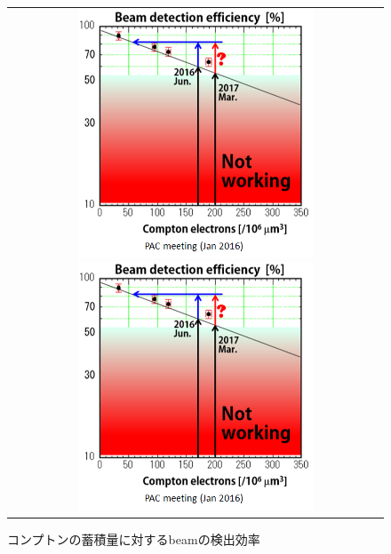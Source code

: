\documentclass[12pt,a4paper]{jarticle}
\begin{document}
\begin{figure}[htbp]
  \centering
      \begin{tabular}{c}
        \begin{minipage}{0.5\hsize}
          \centering
            \includegraphics[clip, width=70mm]{beam_efficiency_to_compton.png}
            \hspace{1.6cm} 
            \caption{保管地点によるコンプトンの蓄積量\label{fig:stragecompton}}
        \end{minipage}
        
        \begin{minipage}{0.5\hsize}
          \centering
            \includegraphics[clip, width=70mm]{beam_efficiency_to_compton.png}
            \hspace{1.6cm} 
            \caption{コンプトンの蓄積量に対するbeamの検出効率\label{fig:beam_efficiency_to_compton}}
        \end{minipage}
      \end{tabular}
\end{figure}
\end{document}
